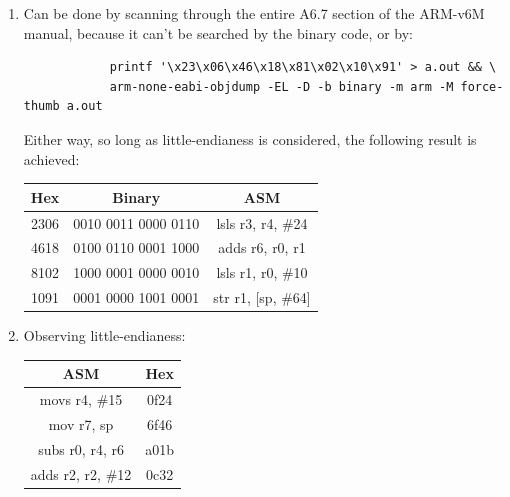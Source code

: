 \documentclass{article}
\begin{document}
\begin{enumerate}
\begin{enumerate}
		      \item \texttt{0xc0a8 0000} $+$ \texttt{0x3fd0 0000} =
		            \begin{align*}
			            c0a8 0000 + 3fd0 0000 & =                                                                                    \\
			                                  & \left(1\right)\_\left(100 0000 1\right)\_\left(010 1000 0000 0000 0000 0000\right)   \\
			                                  & + \left(0\right)\_\left(011 1111 1\right)\_\left(101 0000 0000 0000 0000 0000\right) \\
		            \end{align*}
	      \end{enumerate}

	\item
	      Can be done by scanning through the entire A6.7 section of the
	      ARM-v6M manual, because it can't be searched by the binary code, or
	      by:
	      \begin{verbatim}
            printf '\x23\x06\x46\x18\x81\x02\x10\x91' > a.out && \
            arm-none-eabi-objdump -EL -D -b binary -m arm -M force-thumb a.out
          \end{verbatim}
	      Either way, so long as little-endianess is considered, the following
	      result is achieved:

	      \begin{tabular}{ccc}
		      Hex  & Binary              & ASM                 \\
		      \hline
		      \hline
		      2306 & 0010 0011 0000 0110 & lsls r3, r4, \#24   \\
		      4618 & 0100 0110 0001 1000 & adds r6, r0, r1     \\
		      8102 & 1000 0001 0000 0010 & lsls r1, r0, \#10   \\
		      1091 & 0001 0000 1001 0001 & str  r1, [sp, \#64] \\
		      \hline
		      \hline
	      \end{tabular}

	\item
	      Observing little-endianess:

	      \begin{tabular}{cc}
		      ASM               & Hex  \\
		      \hline
		      \hline
		      movs r4, \#15     & 0f24 \\
		      mov r7, sp        & 6f46 \\
		      subs r0, r4, r6   & a01b \\
		      adds r2, r2, \#12 & 0c32 \\
		      \hline
		      \hline
	      \end{tabular}


\end{enumerate}
\end{document}

